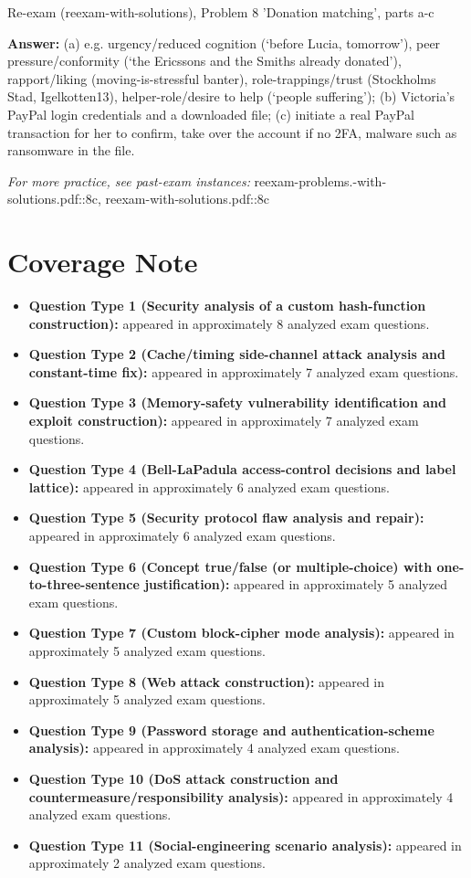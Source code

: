 \documentclass[12pt, a4paper]{article}
\begin{document}
\begin{practicebox}{Re-exam (reexam-with-solutions), Problem 8 'Donation matching', parts a-c}
\begin{itemize}
\end{itemize}
\textbf{Answer:} (a) e.g. urgency/reduced cognition (`before Lucia, tomorrow'), peer pressure/conformity (`the Ericssons and the Smiths already donated'), rapport/liking (moving-is-stressful banter), role-trappings/trust (Stockholms Stad, Igelkotten13), helper-role/desire to help (`people suffering'); (b) Victoria's PayPal login credentials and a downloaded file; (c) initiate a real PayPal transaction for her to confirm, take over the account if no 2FA, malware such as ransomware in the file.
\end{practicebox}

\textit{For more practice, see past-exam instances:} reexam-problems.-with-solutions.pdf::8c, reexam-with-solutions.pdf::8c


\section*{Coverage Note}
\begin{itemize}
    \item \textbf{Question Type 1 (Security analysis of a custom hash-function construction):} appeared in approximately 8 analyzed exam questions.
    \item \textbf{Question Type 2 (Cache/timing side-channel attack analysis and constant-time fix):} appeared in approximately 7 analyzed exam questions.
    \item \textbf{Question Type 3 (Memory-safety vulnerability identification and exploit construction):} appeared in approximately 7 analyzed exam questions.
    \item \textbf{Question Type 4 (Bell-LaPadula access-control decisions and label lattice):} appeared in approximately 6 analyzed exam questions.
    \item \textbf{Question Type 5 (Security protocol flaw analysis and repair):} appeared in approximately 6 analyzed exam questions.
    \item \textbf{Question Type 6 (Concept true/false (or multiple-choice) with one-to-three-sentence justification):} appeared in approximately 5 analyzed exam questions.
    \item \textbf{Question Type 7 (Custom block-cipher mode analysis):} appeared in approximately 5 analyzed exam questions.
    \item \textbf{Question Type 8 (Web attack construction):} appeared in approximately 5 analyzed exam questions.
    \item \textbf{Question Type 9 (Password storage and authentication-scheme analysis):} appeared in approximately 4 analyzed exam questions.
    \item \textbf{Question Type 10 (DoS attack construction and countermeasure/responsibility analysis):} appeared in approximately 4 analyzed exam questions.
    \item \textbf{Question Type 11 (Social-engineering scenario analysis):} appeared in approximately 2 analyzed exam questions.
\end{itemize}
\end{document}
